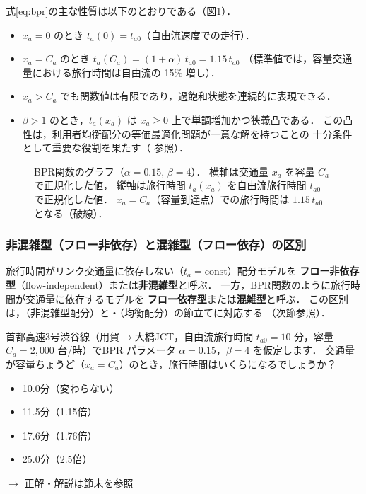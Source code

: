 式\eqref{eq:bpr}の主な性質は以下のとおりである（図\ref{fig:bpr-curve}）．

\begin{itemize}
  \item $x_a = 0$ のとき $t_a(0) = t_{a0}$（自由流速度での走行）．
  \item $x_a = C_a$ のとき $t_a(C_a) = (1+\alpha)\,t_{a0} = 1.15\,t_{a0}$
    （標準値では，容量交通量における旅行時間は自由流の 15\% 増し）．
  \item $x_a > C_a$ でも関数値は有限であり，過飽和状態を連続的に表現できる．
  \item $\beta > 1$ のとき，$t_a(x_a)$ は $x_a \geq 0$ 上で単調増加かつ狭義凸である．
    この凸性は，利用者均衡配分の等価最適化問題が一意な解を持つことの
    十分条件として重要な役割を果たす（ 参照）．
\end{itemize}

\begin{figure}[hbtp]
  \centering
  
  \caption{BPR関数のグラフ（$\alpha=0.15$, $\beta=4$）．
           横軸は交通量 $x_a$ を容量 $C_a$ で正規化した値，
           縦軸は旅行時間 $t_a(x_a)$ を自由流旅行時間 $t_{a0}$ で正規化した値．
           $x_a = C_a$（容量到達点）での旅行時間は $1.15\,t_{a0}$ となる（破線）．}
  \label{fig:bpr-curve}
\end{figure}

\subsubsection*{非混雑型（フロー非依存）と混雑型（フロー依存）の区別}

旅行時間がリンク交通量に依存しない（$t_a = \text{const}$）配分モデルを
\textbf{フロー非依存型}（flow-independent）または\textbf{非混雑型}と呼ぶ．
一方，BPR関数のように旅行時間が交通量に依存するモデルを
\textbf{フロー依存型}または\textbf{混雑型}と呼ぶ．
この区別は，（非混雑型配分）と・（均衡配分）の節立てに対応する
（次節参照）．

\begin{example}[title={クイズ 1：首都高3号線，朝ラッシュで何分遅れる？}]
首都高速3号渋谷線（用賀$\rightarrow$大橋JCT，自由流旅行時間 $t_{a0}=10$ 分，容量 $C_a=2{,}000$ 台/時）でBPR パラメータ $\alpha=0.15$，$\beta=4$ を仮定します．
交通量が容量ちょうど（$x_a = C_a$）のとき，旅行時間はいくらになるでしょうか？
\begin{itemize}
  \item[(ア)] 10.0分（変わらない）
  \item[(イ)] 11.5分（1.15倍）
  \item[(ウ)] 17.6分（1.76倍）
  \item[(エ)] 25.0分（2.5倍）
\end{itemize}
\hyperref[ans:q1]{$\rightarrow$ 正解・解説は節末を参照}
\end{example}

